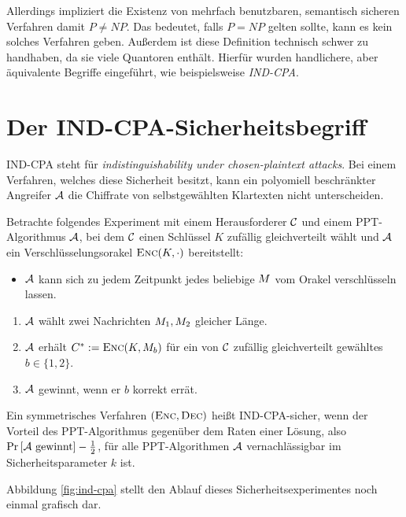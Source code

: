 Allerdings impliziert die Existenz von mehrfach benutzbaren, semantisch sicheren Verfahren damit $P \neq NP$. Das bedeutet, falls $P = NP$ gelten sollte, kann
es kein solches Verfahren geben. Außerdem ist diese Definition technisch schwer zu handhaben, da sie viele Quantoren enthält. Hierfür wurden handlichere, aber äquivalente Begriffe eingeführt, wie beispielsweise \emph{IND-CPA}.

\section{Der IND-CPA-Sicherheitsbegriff}\label{sec:ind-cpa}
IND-CPA steht für \emph{indistinguishability under chosen-plaintext
  attacks}. Bei einem Verfahren, welches diese Sicherheit besitzt, kann
ein polyomiell beschränkter Angreifer $\mathcal{A}$ die Chiffrate von
selbstgewählten Klartexten nicht unterscheiden.
\begin{definition}
	Betrachte folgendes Experiment mit einem Herausforderer $\mathcal{C}$ und einem PPT-Algorithmus $\mathcal{A}$, bei dem $\mathcal{C}$ einen Schlüssel $K$ zufällig gleichverteilt wählt und $\mathcal{A}$ ein Verschlüsselungsorakel $\textsc{Enc}(K,\cdot)$ bereitstellt: 
	\begin{itemize}
		\item $\mathcal{A}$ kann sich zu jedem Zeitpunkt jedes beliebige
                  $M$ vom Orakel verschlüsseln lassen. 
	\end{itemize}
	\begin{enumerate}
		\item $\mathcal{A}$ wählt zwei Nachrichten $M_1, M_2$ gleicher Länge. 
		\item $\mathcal{A}$ erhält $C^{*} := \textsc{Enc}(K,
                  M_{b})$ für ein von $\mathcal{C}$ zufällig gleichverteilt
                  gewähltes $b \in \{1, 2\}$. 
		\item $\mathcal{A}$ gewinnt, wenn er $b$ korrekt errät.
	\end{enumerate}
	Ein symmetrisches Verfahren $(\textsc{Enc}, \textsc{Dec})$ heißt IND-CPA-sicher, wenn der Vorteil des
        PPT-Algorithmus gegenüber dem Raten einer Lösung, also $\Pr
        \left[ \mathcal{A} \textnormal{ gewinnt} \right] - \frac{1}{2}$, für alle
        PPT-Algorithmen $\mathcal{A}$ vernachlässigbar im Sicherheitsparameter $k$  ist. 
\end{definition}
Abbildung \ref{fig:ind-cpa} stellt den Ablauf dieses
Sicherheitsexperimentes noch einmal grafisch dar.

